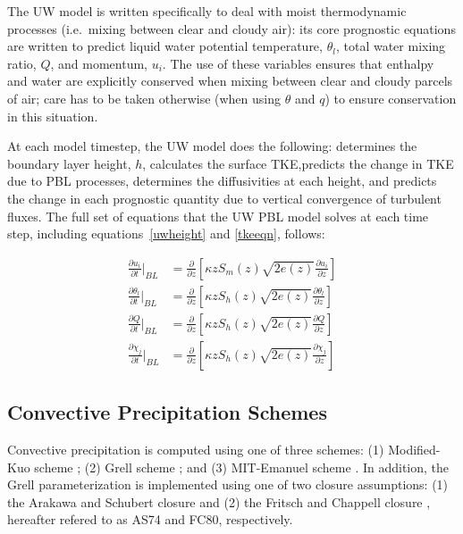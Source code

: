 The UW model is written specifically to deal with moist thermodynamic processes
(i.e.~mixing between clear and cloudy air): its core prognostic equations are
written to predict liquid water potential temperature, $\theta_l$, total water
mixing ratio, $Q$, and momentum, $u_i$.  The use of these variables ensures
that enthalpy and water are explicitly conserved when mixing between clear and
cloudy parcels of air; care has to be taken otherwise (when using $\theta$ and
$q$) to ensure conservation in this situation.

At each model timestep, the UW model does the following: determines the
boundary layer height, $h$, calculates the surface TKE,predicts the change in
TKE due to PBL processes, determines the diffusivities at each height, and
predicts the change in each prognostic quantity due to vertical convergence of
turbulent fluxes.  The full set of equations that the UW PBL model solves at
each time step, including equations~\ref{uwheight} and \ref{tkeeqn}, follows:

\begin{subequations}\label{uwmodel}
\begin{align}
\frac{\partial u_i}{\partial t}\Bigr\rvert_{BL} &= \frac{\partial}{\partial z}[\kappa z S_m(z) \sqrt{2 e(z)} \frac{\partial u_i}{\partial z}]\label{uwmodela} \\
\frac{\partial \theta_l}{\partial t}\Bigr\rvert_{BL} &= \frac{\partial}{\partial z}[\kappa z S_h(z) \sqrt{2 e(z)} \frac{\partial \theta_l}{\partial z}]\label{uwmodelb} \\
\frac{\partial Q}{\partial t}\Bigr\rvert_{BL} &= \frac{\partial}{\partial z}[\kappa z S_h(z) \sqrt{2 e(z)} \frac{\partial Q}{\partial z}]\label{uwmodelc} \\
\frac{\partial \chi_j}{\partial t}\Bigr\rvert_{BL} &= \frac{\partial}{\partial z}[\kappa z S_h(z) \sqrt{2 e(z)} \frac{\partial \chi_j}{\partial z}]\label{uwmodeld} 
\end{align}
\end{subequations}

\subsection{Convective Precipitation Schemes}

Convective precipitation is computed using one of three schemes: (1)
Modified-Kuo scheme \cite{Anthes_77}; (2) Grell scheme \cite{Grell_93}; and (3)
MIT-Emanuel scheme \citep{Emanuel_91,Emanuel_99}. In addition, the Grell
parameterization is implemented using one of two closure assumptions: (1) the
Arakawa and Schubert closure \cite{Grell_94} and (2) the Fritsch and Chappell
closure \cite{Fritsch_80}, hereafter refered to as AS74 and FC80,
respectively.\\

